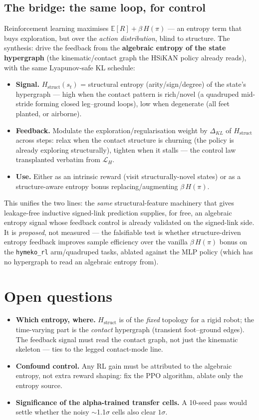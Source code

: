 \documentclass[11pt, a4paper]{article}
\begin{document}
\subsection{The bridge: the same loop, for control}
Reinforcement learning maximises $\mathbb{E}[R] + \beta\,H(\pi)$ --- an entropy term that
buys exploration, but over the \emph{action distribution}, blind to structure. The
synthesis: drive the feedback from the \textbf{algebraic entropy of the state hypergraph}
(the kinematic/contact graph the HSiKAN policy already reads), with the same Lyapunov-safe
KL schedule:
\begin{itemize}\itemsep1pt
  \item \textbf{Signal.} $H_{\mathrm{struct}}(s_t)$ = structural entropy
        (arity/sign/degree) of the state's hypergraph --- high when the contact pattern is
        rich/novel (a quadruped mid-stride forming closed leg--ground loops), low when
        degenerate (all feet planted, or airborne).
  \item \textbf{Feedback.} Modulate the exploration/regularisation weight by
        $\Delta_{KL}$ of $H_{\mathrm{struct}}$ across steps: relax when the contact
        structure is churning (the policy is already exploring structurally), tighten when
        it stalls --- the control law transplanted verbatim from $\mathcal{L}_H$.
  \item \textbf{Use.} Either as an intrinsic reward (visit structurally-novel states) or as
        a structure-aware entropy bonus replacing/augmenting $\beta\,H(\pi)$.
\end{itemize}
This unifies the two lines: the \emph{same} structural-feature machinery that gives
leakage-free inductive signed-link prediction supplies, for free, an algebraic entropy
signal whose feedback control is already validated on the signed-link side. It is
\emph{proposed}, not measured --- the falsifiable test is whether structure-driven
entropy feedback improves sample efficiency over the vanilla $\beta\,H(\pi)$ bonus on the
\texttt{hymeko\_rl} arm/quadruped tasks, ablated against the MLP policy (which has no
hypergraph to read an algebraic entropy from).

\section{Open questions}
\begin{itemize}\itemsep1pt
  \item \textbf{Which entropy, where.} $H_{\mathrm{struct}}$ is of the \emph{fixed}
        topology for a rigid robot; the time-varying part is the \emph{contact} hypergraph
        (transient foot--ground edges). The feedback signal must read the contact graph,
        not just the kinematic skeleton --- ties to the legged contact-mode line.
  \item \textbf{Confound control.} Any RL gain must be attributed to the algebraic entropy,
        not extra reward shaping: fix the PPO algorithm, ablate only the entropy source.
  \item \textbf{Significance of the alpha-trained transfer cells.} A 10-seed pass would
        settle whether the noisy $\sim$1.1$\sigma$ cells also clear $1\sigma$.
\end{itemize}
\end{document}
